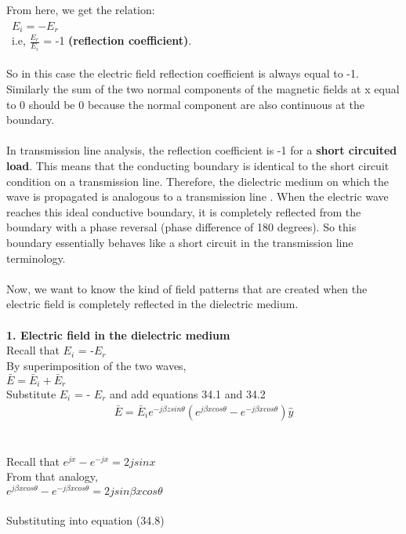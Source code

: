 \\\\ From here, we get the relation:
\\\ $E_i = - E_r$
\\\ i.e, $\frac{E_r}{E_i}$ = -1 \textbf{(reflection coefficient)}. \\\\
So in this case the electric field reflection coefficient is always equal
to -1. Similarly the sum of the two normal components of the
magnetic fields at x equal to 0 should be 0 because the normal
component are also continuous at the boundary.
\\\\ In transmission line analysis, the reflection coefficient is -1 for a \textbf{short	circuited load}. This means that the conducting boundary is identical to the short circuit condition on a transmission line. Therefore, the dielectric medium on which the wave is propagated is analogous to a
transmission line . When the electric wave reaches this ideal conductive boundary, it is completely
reflected from the boundary with a phase reversal (phase difference of
180 degrees). So this boundary essentially behaves like a short circuit
in the transmission line terminology. 
\\\\Now, we want to know the kind of field patterns that are created
when the electric field is completely reflected in the dielectric medium.
\\\\ \textbf{1. Electric field in the dielectric medium}
\\ Recall that $E_{i}$ = -$E_{r}$
\\ By superimposition of the two waves,
\\ $\bar{E}= \bar{E}_i + \bar{E}_r$
\\ Substitute $E_i$ = - $E_r$ and add equations 34.1 and 34.2
\\ \begin{align}
\bar{E}= \bar{E}_i e^{-j\beta zsin\theta} (e^{j\beta xcos\theta }- e^{-j\beta xcos\theta}) \hat{y}
\end{align}
\\\\ Recall that $e^{jx} - e^{-jx} = 2jsinx$
\\ From that analogy, 
\\ $e^{j\beta xcos\theta} - e^{-j\beta xcos\theta} = 2jsin\beta xcos\theta$
\\\\ Substituting into equation (34.8)
